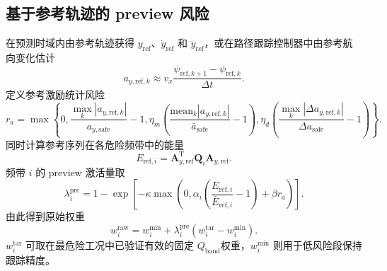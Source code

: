\documentclass[UTF8,zihao=-4]{ctexrep}
\newcommand{\Qband}{$Q_{\mathrm{band}}$}
\newcommand{\T}{\mathrm{T}}
\begin{document}
\subsection{基于参考轨迹的 preview 风险}
在预测时域内由参考轨迹获得 $y_{\mathrm{ref}}$、$\dot y_{\mathrm{ref}}$ 和 $\ddot y_{\mathrm{ref}}$，或在路径跟踪控制器中由参考航向变化估计
\begin{equation}
    a_{y,\mathrm{ref},k}\approx v_x\frac{\psi_{\mathrm{ref},k+1}-\psi_{\mathrm{ref},k}}{\Delta t}.
\end{equation}
定义参考激励统计风险
\begin{equation}
    r_a=\max\left\{0,\frac{\max_k|a_{y,\mathrm{ref},k}|}{a_{y,\mathrm{safe}}}-1,\eta_m\left(\frac{\mathrm{mean}_k|a_{y,\mathrm{ref},k}|}{\bar a_{\mathrm{safe}}}-1\right),\eta_d\left(\frac{\max_k|\Delta a_{y,\mathrm{ref},k}|}{\Delta a_{\mathrm{safe}}}-1\right)\right\}.
\end{equation}
同时计算参考序列在各危险频带中的能量
\begin{equation}
    E_{\mathrm{ref},i}=\bm A_{y,\mathrm{ref}}^{\T}\bm Q_i\bm A_{y,\mathrm{ref}}.
\end{equation}
频带 $i$ 的 preview 激活量取
\begin{equation}
    \lambda_i^{\mathrm{pre}}=1-\exp\left[-\kappa\max\left(0,\alpha_i\left(\frac{E_{\mathrm{ref},i}}{\bar E_{\mathrm{ref},i}}-1\right)+\beta r_a\right)\right].
\end{equation}
由此得到原始权重
\begin{equation}
    w_i^{\mathrm{raw}}=w_i^{\min}+\lambda_i^{\mathrm{pre}}(w_i^{\mathrm{tar}}-w_i^{\min}).
\end{equation}
$w_i^{\mathrm{tar}}$ 可取在最危险工况中已验证有效的固定 \Qband 权重，$w_i^{\min}$ 则用于低风险段保持跟踪精度。
\end{document}
